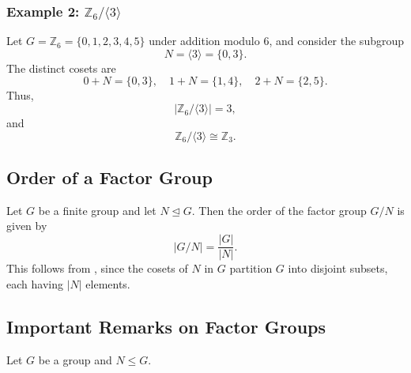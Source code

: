 \documentclass[a4paper,12pt]{article}
\theoremstyle{definition}
\begin{document}
\subsubsection*{Example 2: \texorpdfstring{$\mathbb{Z}_6 / \langle 3 \rangle$}{Z6/<3>}}

Let $G=\mathbb{Z}_6=\{0,1,2,3,4,5\}$ under addition modulo $6$, and consider the subgroup
\begin{equation*}
N=\langle 3 \rangle = \{0,3\}.
\end{equation*}
The distinct cosets are
\begin{equation*}
0+N = \{0,3\}, \quad
1+N = \{1,4\}, \quad
2+N = \{2,5\}.
\end{equation*}
Thus,
\begin{equation*}
|\mathbb{Z}_6 / \langle 3 \rangle| = 3,
\end{equation*}
and
\begin{equation*}
\mathbb{Z}_6 / \langle 3 \rangle \cong \mathbb{Z}_3.
\end{equation*}

\subsection{Order of a Factor Group}

Let $G$ be a finite group and let $N \trianglelefteq G$. 
Then the order of the factor group $G/N$ is given by
\begin{equation*}
|G/N| = \frac{|G|}{|N|}.
\end{equation*}
This follows from , since the cosets of $N$ in $G$ partition $G$ into disjoint subsets, each having $|N|$ elements.

\subsection{Important Remarks on Factor Groups}

Let $G$ be a group and $N \leq G$.
\end{document}
